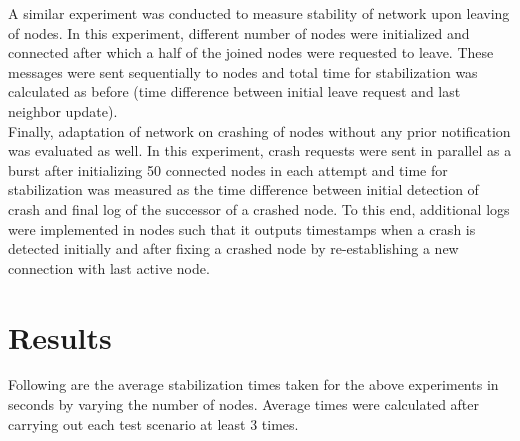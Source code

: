 \documentclass[
    a4paper,
    twocolumn,
]{article}
\begin{document}
A similar experiment was conducted to measure stability of network upon leaving of nodes. In this experiment, different number of nodes were initialized and connected after which a half of the joined nodes were requested to leave. These messages were sent sequentially to nodes and total time for stabilization was calculated as before (time difference between initial leave request and last neighbor update).\\

Finally, adaptation of network on crashing of nodes without any prior notification was evaluated as well. In this experiment, crash requests were sent in parallel as a burst after initializing 50 connected nodes in each attempt and time for stabilization was measured as the time difference between initial detection of crash and final log of the successor of a crashed node. To this end, additional logs were implemented in nodes such that it outputs timestamps when a crash is detected initially and after fixing a crashed node by re-establishing a new connection with last active node.

\section{Results}

Following are the average stabilization times taken for the above experiments in seconds by varying the number of nodes. Average times were calculated after carrying out each test scenario at least 3 times.\\

\begin{table}[!ht]
\renewcommand{\arraystretch}{1.4}
\centering
{}
\caption{Results of experiment 1 and 2 with average times for stabilization}
\end{table}
\end{document}
